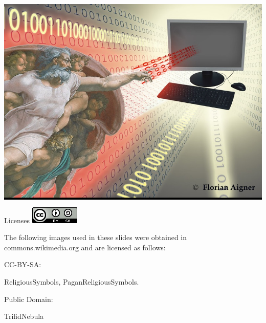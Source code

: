 \begin{frame}[plain]
\colorbox{black}{\includegraphics[width=\textwidth]{Images/Transitions/GodComputerC}}
\end{frame}

\begin{frame}{Licenses} \centering
\includegraphics[scale=0.5]{Images/CC-BY-SA.png}

\bigskip
\bigskip

\begin{center}
The following images used in these slides were obtained in commons.wikimedia.org and are licensed as follows:

\bigskip

CC-BY-SA:

ReligiousSymbols, PaganReligiousSymbols.

\bigskip

Public Domain: 

TrifidNebula
\end{center}
\end{frame}
